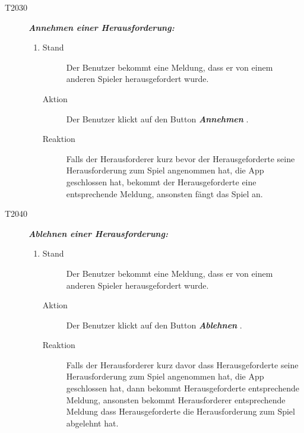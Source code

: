 \documentclass[parskip=full]{scrartcl}
\begin{document}
\begin{description}
	\item[T2030] \textbf{\textit{Annehmen einer Herausforderung: }} 
	\begin{enumerate}
		\item 
		\begin{description}
			\item[Stand] Der Benutzer bekommt eine Meldung, dass er von einem anderen Spieler herausgefordert wurde.
			\item[Aktion] Der Benutzer klickt auf den Button \textbf{\textit{Annehmen }}. 
			\item[Reaktion] Falls der Herausforderer kurz bevor der Herausgeforderte seine Herausforderung zum Spiel angenommen hat, die App geschlossen hat, bekommt der Herausgeforderte eine entsprechende Meldung, ansonsten fängt das Spiel an.
		\end{description}
	\end{enumerate}
	
	\item[T2040] \textbf{\textit{Ablehnen einer Herausforderung: }} 
	\begin{enumerate}
		\item 
		\begin{description}
			\item[Stand] Der Benutzer bekommt eine Meldung, dass er von einem anderen Spieler herausgefordert wurde.
			\item[Aktion] Der Benutzer klickt auf den Button \textbf{\textit{Ablehnen }}.
			\item[Reaktion] Falls der Herausforderer kurz davor dass Herausgeforderte seine Herausforderung zum Spiel angenommen hat, die App geschlossen hat, dann bekommt Herausgeforderte entsprechende Meldung, ansonsten bekommt Herausforderer entsprechende Meldung dass Herausgeforderte die Herausforderung zum Spiel abgelehnt hat.
		\end{description}
	\end{enumerate}
	

\end{description}
\end{document}

